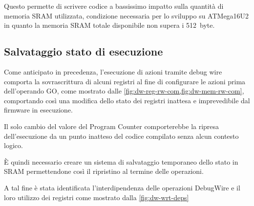 Questo permette di scrivere codice a bassissimo impatto sulla quantità di memoria SRAM utilizzata, condizione necessaria per lo sviluppo su ATMega16U2 in quanto la memoria SRAM totale disponibile non supera i \SI{512}{byte}\cite{avr:m16u2}.

\subsection{Salvataggio stato di esecuzione}

Come anticipato in precedenza, l'esecuzione di azioni tramite debug wire comporta la sovrascrittura di alcuni registri al fine di configurare le azioni prima dell'operando GO, come mostrato dalle \cref{fig:dw-reg-rw-com,fig:dw-mem-rw-com}, comportando così una modifica dello stato dei registri inattesa e imprevedibile dal firmware in esecuzione.

Il solo cambio del valore del Program Counter comporterebbe la ripresa dell'esecuzione da un punto inatteso del codice compilato senza alcun contesto logico.

È quindi necessario creare un sistema di salvataggio temporaneo dello stato in SRAM permettendone così il ripristino al termine delle operazioni.

A tal fine è stata identificata l'interdipendenza delle operazioni DebugWire e il loro utilizzo dei registri come mostrato dalla \cref{fig:dw-wrt-deps}

